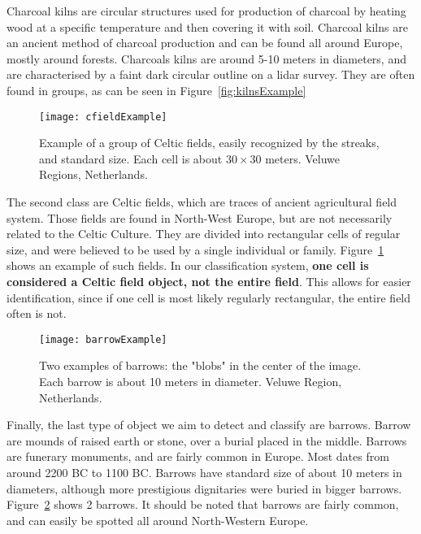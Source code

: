 Charcoal kilns are circular structures used for production of charcoal by heating wood at a specific temperature and then covering it with soil. Charcoal kilns are an ancient method of charcoal production and can be found all around Europe, mostly around forests. Charcoals kilns are around 5-10 meters in diameters, and are characterised by a faint dark circular outline on a \gls{lidar} survey\cite{hirschAl2020}. They are often found in groups, as can be seen in Figure~\ref{fig:kilnsExample}

\begin{figure}[H]
  \centering
	\texttt{[image: cfieldExample]}
	\caption[Celtic Fields]{Example of a group of Celtic fields, easily recognized by the streaks, and standard size. Each cell is about $30 \times 30$ meters. Veluwe Regions, Netherlands.}
  \label{fig:cfieldsExample}
\end{figure}

The second class are Celtic fields, which are traces of ancient agricultural field system. Those fields are found in North-West Europe, but are not necessarily related to the Celtic Culture. They are divided into rectangular cells of regular size, and were believed to be used by a single individual or family\cite{arnoldussen2018}. Figure~\ref{fig:cfieldsExample} shows an example of such fields. In our classification system, \textbf{one cell is considered a Celtic field object, not the entire field}. This allows for easier identification, since if one cell is most likely regularly rectangular, the entire field often is not.

\begin{figure}[H]
  \centering
  \texttt{[image: barrowExample]}
	\caption[Barrows]{Two examples of barrows: the "blobs" in the center of the image. Each barrow is about 10 meters in diameter. Veluwe Region, Netherlands.}
  \label{fig:barrowExample}
\end{figure}

Finally, the last type of object we aim to detect and classify are barrows. Barrow are mounds of raised earth or stone, over a burial placed in the middle. Barrows are funerary monuments, and are fairly common in Europe. Most dates from around 2200 BC to 1100 BC. Barrows have standard size of about 10 meters in diameters, although more prestigious dignitaries were buried in bigger barrows\cite{bourgeois2013}. Figure~\ref{fig:barrowExample} shows 2 barrows. It should be noted that barrows are fairly common, and can easily be spotted all around North-Western Europe.

